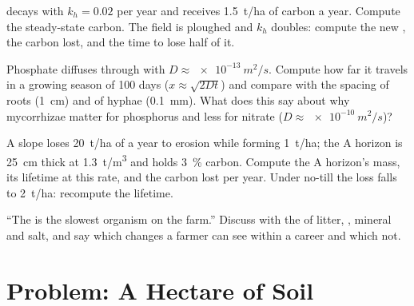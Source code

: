 \begin{exercise}[$\star\star$]\label{exo:b2:living-soil:9}
  decays with $k_h = 0.02$ per year and receives
\qty{1.5}{t/ha} of carbon a year. Compute the steady-state 
carbon. The field is ploughed and $k_h$ doubles: compute the new
, the carbon lost, and the time to lose half of it.
\end{exercise}

\begin{exercise}[$\star\star\star$]\label{exo:b2:living-soil:10}
Phosphate diffuses through  with $D \approx \qty{e-13}{m^2/s}$.
Compute how far it travels in a growing season of \num{100} days
($x \approx \sqrt{2Dt}$) and compare with the spacing of roots
(\qty{1}{cm}) and of hyphae (\qty{0.1}{mm}). What does this say
about why mycorrhizae matter for phosphorus and less for nitrate
($D \approx \qty{e-10}{m^2/s}$)?
\end{exercise}

\begin{exercise}[$\star\star\star$]\label{exo:b2:living-soil:11}
A slope loses \qty{20}{t/ha} of  a year to erosion while
forming \qty{1}{t/ha}; the A horizon is \qty{25}{cm} thick at
\qty{1.3}{t/m^3} and holds \qty{3}{\%} carbon. Compute the A
horizon's mass, its lifetime at this rate, and the carbon lost per
year. Under no-till the loss falls to \qty{2}{t/ha}: recompute the
lifetime.
\end{exercise}

\begin{exercise}[$\star\star\star$]\label{exo:b2:living-soil:12}
``The  is the slowest organism on the farm.'' Discuss with the
 of litter, , mineral  and salt, and say
which changes a farmer can see within a career and which not.
\end{exercise}

\section{Problem: A Hectare of Soil}

